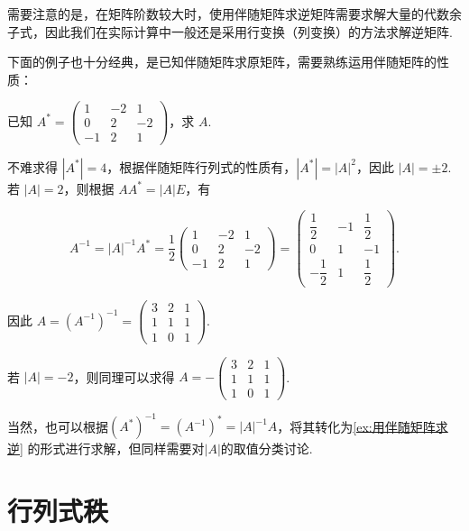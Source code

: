 需要注意的是，在矩阵阶数较大时，使用伴随矩阵求逆矩阵需要求解大量的代数余子式，因此我们在实际计算中一般还是采用行变换（列变换）的方法求解逆矩阵.

下面的例子也十分经典，是已知伴随矩阵求原矩阵，需要熟练运用伴随矩阵的性质：

\begin{example}{}{}
    已知 $A^*=\begin{pmatrix}
            1 & -2 & 1 \\ 0 & 2 & -2 \\ -1 & 2 & 1
        \end{pmatrix}$，求 $A$.
\end{example}

\begin{solution}
    不难求得 $|A^*| = 4$，根据伴随矩阵行列式的性质有，$|A^*| = |A|^2$，因此 $|A| = \pm 2$. 若 $|A| = 2$，则根据 $AA^* = |A|E$，有

    \[A^{-1} = |A|^{-1}A^* = \frac{1}{2}\begin{pmatrix}
            1 & -2 & 1 \\ 0 & 2 & -2 \\ -1 & 2 & 1
        \end{pmatrix} = \begin{pmatrix}
            \dfrac{1}{2} & -1 & \dfrac{1}{2} \\ 0 & 1 & -1 \\ -\dfrac{1}{2} & 1 & \dfrac{1}{2}
        \end{pmatrix}.\]

    因此 $A = (A^{-1})^{-1} = \begin{pmatrix}
            3 & 2 & 1 \\ 1 & 1 & 1 \\ 1 & 0 & 1
        \end{pmatrix}$.

    若 $|A| = -2$，则同理可以求得 $A = -\begin{pmatrix}
            3 & 2 & 1 \\ 1 & 1 & 1 \\ 1 & 0 & 1
        \end{pmatrix}$.
\end{solution}

当然，也可以根据$(A^*)^{-1}=(A^{-1})^*=|A|^{-1}A$，将其转化为\autoref{ex:用伴随矩阵求逆} 的形式进行求解，但同样需要对$|A|$的取值分类讨论.

\section{行列式秩}


